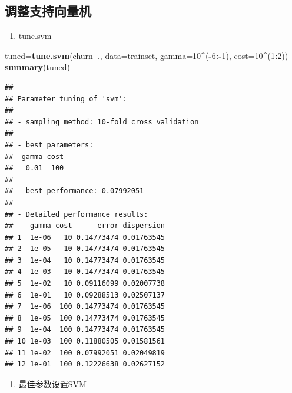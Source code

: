 \documentclass[
]{article}
\newenvironment{Shaded}{\begin{snugshade}}{\end{snugshade}}
\newcommand{\DataTypeTok}[1]{\textcolor[rgb]{0.13,0.29,0.53}{#1}}
\newcommand{\DecValTok}[1]{\textcolor[rgb]{0.00,0.00,0.81}{#1}}
\newcommand{\KeywordTok}[1]{\textcolor[rgb]{0.13,0.29,0.53}{\textbf{#1}}}
\newcommand{\NormalTok}[1]{#1}
\newcommand{\OperatorTok}[1]{\textcolor[rgb]{0.81,0.36,0.00}{\textbf{#1}}}
\providecommand{\tightlist}{%
  \setlength{\itemsep}{0pt}\setlength{\parskip}{0pt}}
\begin{document}
\hypertarget{ux8c03ux6574ux652fux6301ux5411ux91cfux673a}{%
\subsection{调整支持向量机}\label{ux8c03ux6574ux652fux6301ux5411ux91cfux673a}}

\begin{enumerate}
\def\labelenumi{\arabic{enumi}.}
\tightlist
\item
  tune.svm
\end{enumerate}

\begin{Shaded}
\begin{Highlighting}[]
\NormalTok{tuned=}\KeywordTok{tune.svm}\NormalTok{(churn}\OperatorTok{~}\NormalTok{.,}
               \DataTypeTok{data=}\NormalTok{trainset,}
               \DataTypeTok{gamma=}\DecValTok{10}\OperatorTok{^}\NormalTok{(}\OperatorTok{-}\DecValTok{6}\OperatorTok{:-}\DecValTok{1}\NormalTok{),}
               \DataTypeTok{cost=}\DecValTok{10}\OperatorTok{^}\NormalTok{(}\DecValTok{1}\OperatorTok{:}\DecValTok{2}\NormalTok{))}
\KeywordTok{summary}\NormalTok{(tuned)}
\end{Highlighting}
\end{Shaded}

\begin{verbatim}
## 
## Parameter tuning of 'svm':
## 
## - sampling method: 10-fold cross validation 
## 
## - best parameters:
##  gamma cost
##   0.01  100
## 
## - best performance: 0.07992051 
## 
## - Detailed performance results:
##    gamma cost      error dispersion
## 1  1e-06   10 0.14773474 0.01763545
## 2  1e-05   10 0.14773474 0.01763545
## 3  1e-04   10 0.14773474 0.01763545
## 4  1e-03   10 0.14773474 0.01763545
## 5  1e-02   10 0.09116099 0.02007738
## 6  1e-01   10 0.09288513 0.02507137
## 7  1e-06  100 0.14773474 0.01763545
## 8  1e-05  100 0.14773474 0.01763545
## 9  1e-04  100 0.14773474 0.01763545
## 10 1e-03  100 0.11880505 0.01581561
## 11 1e-02  100 0.07992051 0.02049819
## 12 1e-01  100 0.12226638 0.02627152
\end{verbatim}

\begin{enumerate}
\def\labelenumi{\arabic{enumi}.}
\setcounter{enumi}{2}
\tightlist
\item
  最佳参数设置SVM
\end{enumerate}

\begin{Shaded}
\end{Shaded}
\end{document}
